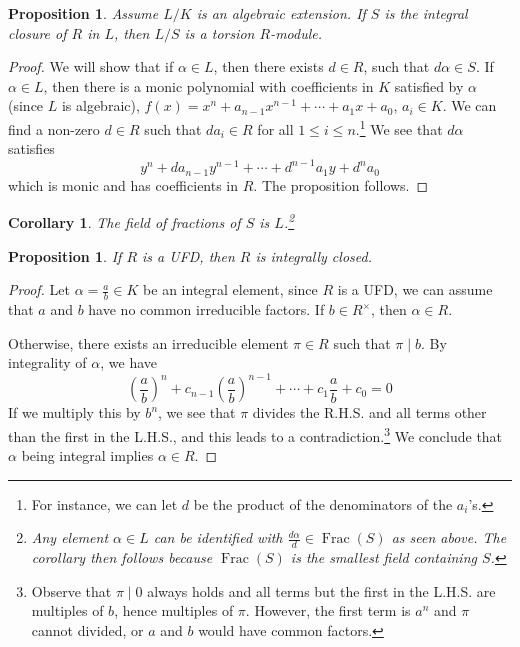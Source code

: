 \documentclass{tufte-handout} %
\newtheorem{cor}[thm]{Corollary}
\newtheorem{prop}[thm]{Proposition}
\theoremstyle{definition}
\theoremstyle{remark}
\newcommand{\bra}[1]{\left(#1\right)}
\DeclareMathOperator{\ff}{Frac}
\begin{document}
\begin{prop}\label{l/stors}
	Assume $L/K$ is an algebraic extension. If $S$ is the integral closure of $R$ in $L$, then $L/S$ is a torsion $R$-module.
\end{prop}
\begin{proof}
	We will show that if $\alpha \in L$, then there exists $d \in R$, such that $d\alpha \in S$. If $\alpha \in L$, then there is a monic polynomial with coefficients in $K$ satisfied by $\alpha$ (since $L$ is algebraic), $f(x) = x^n + a_{n-1}x^{n-1}+ \cdots +a_1x+a_0$, $a_i \in K$. We can find a non-zero $d \in R$ such that $da_i \in R$ for all $1\leq i\leq n$.\footnote{For instance, we can let $d$ be the product of the denominators of the $a_i$'s.} We see that $d\alpha$ satisfies $$y^n+da_{n-1}y^{n-1} + \cdots + d^{n-1}a_1y + d^na_0$$ which is monic and has coefficients in $R$. The proposition follows.
\end{proof}
\begin{cor}
	The field of fractions of $S$ is $L$.\footnote{Any element $\alpha \in L$ can be identified with $\frac{d\alpha}{d} \in \ff(S)$ as seen above. The corollary then follows because $\ff(S)$ is the smallest field containing $S$.
	}
\end{cor}
\begin{prop}\label{ufdint}
	If $R$ is a UFD, then $R$ is integrally closed.
\end{prop}
\begin{proof}
	Let $\alpha = \frac{a}{b} \in K$ be an integral element, since $R$ is a UFD, we can assume that $a$ and $b$ have no common irreducible factors. If $b \in R^{\times}$, then $\alpha \in R$.
	
	Otherwise, there exists an irreducible element $\pi \in R$ such that $\pi \mid b$. By integrality of $\alpha$, we have
	\[\bra{\frac{a}{b}}^n + c_{n-1}\bra{\frac{a}{b}}^{n-1}+ \cdots + c_1\frac{a}{b} + c_0= 0\]
	If we multiply this by $b^n$, we see that $\pi$ divides the R.H.S. and all terms other than the first in the L.H.S., and this leads to a contradiction.\footnote{Observe that $\pi \mid 0$ always holds and all terms but the first in the L.H.S. are multiples of $b$, hence multiples of $\pi$. However, the first term is $a^n$ and $\pi$ cannot divided, or $a$ and $b$ would have common factors.} We conclude that $\alpha$ being integral implies $\alpha \in R$.
\end{proof}
\end{document}
